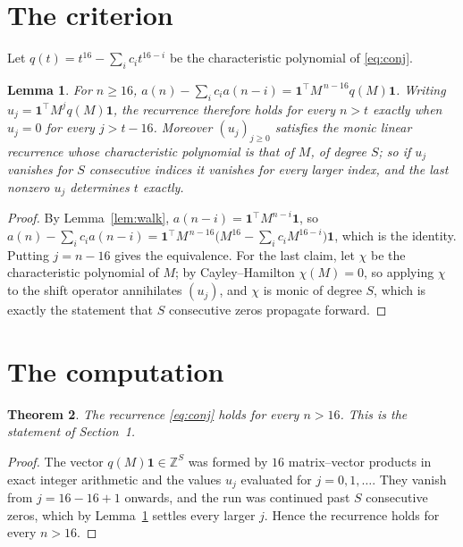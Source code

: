 \documentclass[11pt,a4paper]{article}
\theoremstyle{plain}
\newtheorem{theorem}{Theorem}
\newtheorem{lemma}[theorem]{Lemma}
\theoremstyle{definition}
\begin{document}
\section{The criterion}

Let $q(t)=t^{16}-\sum_i c_i t^{16-i}$ be the characteristic polynomial of
\eqref{eq:conj}.

\begin{lemma}\label{lem:crit}
For $n\ge16$,
$a(n)-\sum_i c_i a(n-i)=\mathbf{1}^{\!\top}M^{\,n-16}q(M)\mathbf{1}$. Writing
$u_j=\mathbf{1}^{\!\top}M^{j}q(M)\mathbf{1}$, the recurrence therefore holds for every
$n>t$ exactly when $u_j=0$ for every $j>t-16$. Moreover $(u_j)_{j\ge0}$ satisfies the
monic linear recurrence whose characteristic polynomial is that of $M$, of degree $S$; so
if $u_j$ vanishes for $S$ consecutive indices it vanishes for every larger index, and the
last nonzero $u_j$ determines $t$ exactly.
\end{lemma}

\begin{proof}
By Lemma~\ref{lem:walk}, $a(n-i)=\mathbf{1}^{\!\top}M^{n-i}\mathbf{1}$, so
$a(n)-\sum_i c_i a(n-i)
=\mathbf{1}^{\!\top}M^{\,n-16}\bigl(M^{16}-\sum_i c_i M^{16-i}\bigr)
\mathbf{1}$, which is the identity. Putting $j=n-16$ gives the equivalence. For the
last claim, let $\chi$ be the characteristic polynomial of $M$; by Cayley--Hamilton
$\chi(M)=0$, so applying $\chi$ to the shift operator annihilates $(u_j)$, and $\chi$ is
monic of degree $S$, which is exactly the statement that $S$ consecutive zeros propagate
forward.
\end{proof}

\section{The computation}

\begin{theorem}
The recurrence \eqref{eq:conj} holds for every $n>16$. This is the statement of
Section~1.
\end{theorem}

\begin{proof}
The vector $q(M)\mathbf{1}\in\mathbb{Z}^{S}$ was formed by $16$ matrix--vector
products in exact integer arithmetic and the values $u_j$ evaluated for
$j=0,1,\dots$. They vanish from $j=16-16+1$ onwards, and the run was continued past
$S$ consecutive zeros, which by Lemma~\ref{lem:crit} settles every larger $j$. Hence the
recurrence holds for every $n>16$.
\end{proof}
\end{document}
